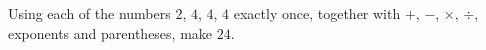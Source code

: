 Using each of the numbers $2$, $4$, $4$, $4$ exactly once, together with $+$, $-$, $\times$, $\div$, exponents and parentheses, make $24$.
